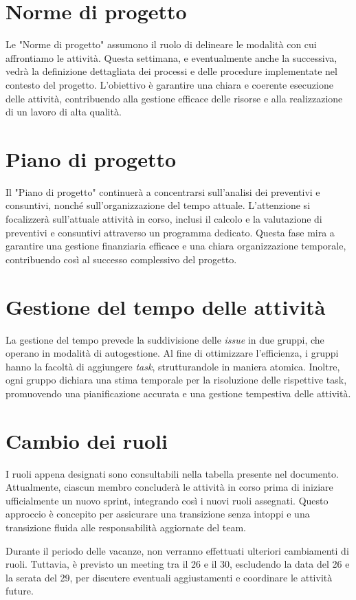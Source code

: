 \section{Norme di progetto}
Le "Norme di progetto" assumono il ruolo di delineare le modalità con cui affrontiamo le attività.
Questa settimana, e eventualmente anche la successiva, vedrà la definizione dettagliata dei processi e delle procedure
implementate nel contesto del progetto.
L'obiettivo è garantire una chiara e coerente esecuzione delle attività, contribuendo alla gestione efficace delle
risorse e alla realizzazione di un lavoro di alta qualità.


\section{Piano di progetto}
Il "Piano di progetto" continuerà a concentrarsi sull'analisi dei preventivi e consuntivi,
nonché sull'organizzazione del tempo attuale. L'attenzione si focalizzerà sull'attuale attività in corso,
inclusi il calcolo e la valutazione di preventivi e consuntivi attraverso un programma dedicato.
Questa fase mira a garantire una gestione finanziaria efficace e una chiara organizzazione temporale,
contribuendo così al successo complessivo del progetto.


\section{Gestione del tempo delle attività}
La gestione del tempo prevede la suddivisione delle \textit{issue} in due gruppi, che operano in modalità di autogestione.
Al fine di ottimizzare l'efficienza, i gruppi hanno la facoltà di aggiungere \textit{task}, strutturandole in maniera atomica.
Inoltre, ogni gruppo dichiara una stima temporale per la risoluzione delle rispettive task,
promuovendo una pianificazione accurata e una gestione tempestiva delle attività.


\section{Cambio dei ruoli}
I ruoli appena designati sono consultabili nella tabella presente nel documento.
Attualmente, ciascun membro concluderà le attività in corso prima di iniziare ufficialmente un nuovo sprint,
integrando così i nuovi ruoli assegnati. Questo approccio è concepito per assicurare una transizione senza intoppi
e una transizione fluida alle responsabilità aggiornate del team.

Durante il periodo delle vacanze, non verranno effettuati ulteriori cambiamenti di ruoli.
Tuttavia, è previsto un meeting tra il 26 e il 30, escludendo la data del 26 e la serata del 29,
per discutere eventuali aggiustamenti e coordinare le attività future.
